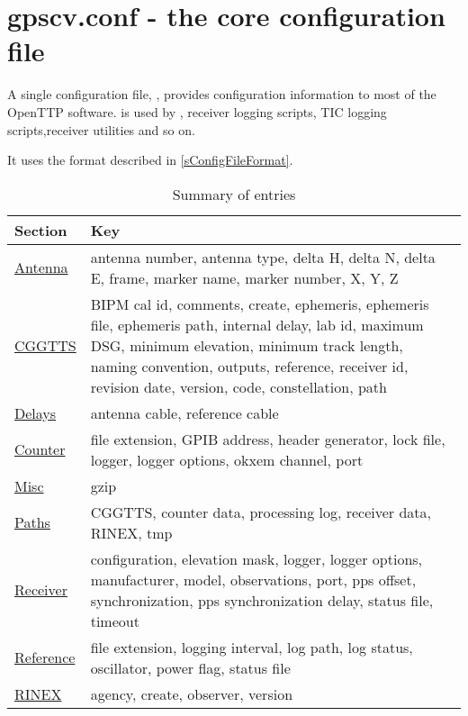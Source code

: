 \section{gpscv.conf - the core configuration file \label{sgpscvconf} }

A single configuration file, , provides configuration information to most of the
OpenTTP software. 
 is used by , receiver logging scripts, TIC logging scripts,receiver utilities and so on.

It uses the format described in \ref{sConfigFileFormat}.

\begin{table}[h]
\begin{tabular}{l|p{10cm}}
Section & Key \\ \hline
\hyperlink{h:antenna}{Antenna} & antenna number, antenna type, 
				delta H, delta N, delta E, frame,
				marker name, marker number,
				X, Y, Z\\ \hline
\hyperlink{h:cggtts}{CGGTTS} & BIPM cal id, comments, create, 
         ephemeris, ephemeris file, ephemeris path,
         internal delay, lab id, maximum DSG, minimum elevation,
         minimum track length, naming convention, outputs, reference,
         receiver id, revision date, version,
         code, constellation, path
         \\ \hline
\hyperlink{h:delays}{Delays}  & antenna cable, reference cable 
         \\ \hline
\hyperlink{h:counter}{Counter} & file extension, GPIB address, header generator, lock file,
         logger, logger options, okxem channel, port
				\\ \hline
\hyperlink{h:misc}{Misc}    & gzip
				\\ \hline
\hyperlink{h:paths}{Paths} & CGGTTS, counter data, processing log, receiver data, RINEX, tmp
				\\ \hline
\hyperlink{h:receiver}{Receiver} & configuration, elevation mask, logger, logger options, 
				 manufacturer, model, observations, 
         port, pps offset, synchronization, pps synchronization delay,
         status file, timeout
				\\ \hline
\hyperlink{h:reference}{Reference} & file extension, logging interval, log path, log status, oscillator, power flag, status file
        \\ \hline
\hyperlink{h:rinex}{RINEX}  & agency, create, observer, version
				\\ \hline
\end{tabular}
\caption{Summary of  entries}
\end{table}

